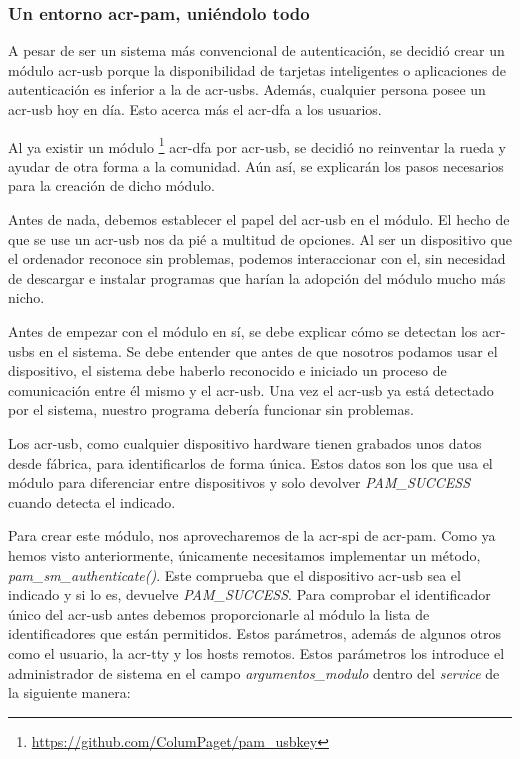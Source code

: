 \documentclass[twoside, titlepage, 12pt, a4paper]{article}
\begin{document}
{\subsubsection{Un entorno \gls{acr-pam}, uniéndolo todo}
A pesar de ser un sistema más convencional de autenticación, se decidió crear un módulo \gls{acr-usb} porque la disponibilidad de tarjetas inteligentes o aplicaciones de autenticación es inferior a la de \gls{acr-usb}s. Además, cualquier persona posee un \gls{acr-usb} hoy en día. Esto acerca más el \gls{acr-dfa} a los usuarios. \par
Al ya existir un módulo \footnote{\url{https://github.com/ColumPaget/pam_usbkey}} \gls{acr-dfa} por \gls{acr-usb}, se decidió no reinventar la rueda y ayudar de otra forma a la comunidad. Aún así, se explicarán los pasos necesarios para la creación de dicho módulo. \par
Antes de nada, debemos establecer el papel del \gls{acr-usb} en el módulo. El hecho de que se use un \gls{acr-usb} nos da pié a multitud de opciones. Al ser un dispositivo que el ordenador reconoce sin problemas, podemos interaccionar con el, sin necesidad de descargar e instalar programas que harían la adopción del módulo mucho más nicho.\par
Antes de empezar con el módulo en sí, se debe explicar cómo se detectan los \gls{acr-usb}s en el sistema. Se debe entender que antes de que nosotros podamos usar el dispositivo, el sistema debe haberlo reconocido e iniciado un proceso de comunicación entre él mismo y el \gls{acr-usb}. Una vez el \gls{acr-usb} ya está detectado por el sistema, nuestro programa debería funcionar sin problemas.\par
Los \gls{acr-usb}, como cualquier dispositivo hardware tienen grabados unos datos desde fábrica, para identificarlos de forma única. Estos datos son los que usa el módulo para diferenciar entre dispositivos y solo devolver \textit{PAM\_SUCCESS} cuando detecta el indicado.\par
Para crear este módulo, nos aprovecharemos de la \gls{acr-spi} de \gls{acr-pam}. Como ya hemos visto anteriormente, únicamente necesitamos implementar un método, \textit{pam\_sm\_authenticate()}. Este comprueba que el dispositivo \gls{acr-usb} sea el indicado y si lo es, devuelve \textit{PAM\_SUCCESS}. 
Para comprobar el identificador único del \gls{acr-usb} antes debemos proporcionarle al módulo la lista de identificadores que están permitidos. Estos parámetros, además de algunos otros como el usuario, la \gls{acr-tty} y los hosts remotos. Estos parámetros los introduce el administrador de sistema en el campo \textit{argumentos\_modulo} dentro del \textit{service} de la siguiente manera:
}
\end{document}
